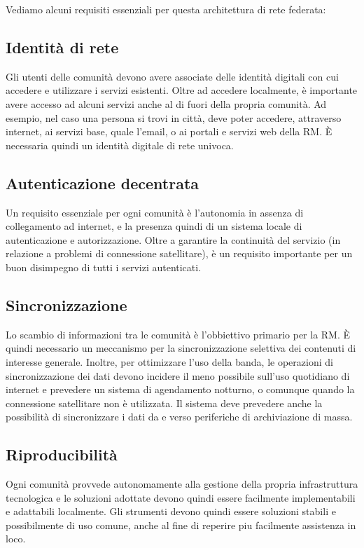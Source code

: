 Vediamo alcuni requisiti essenziali per questa architettura di rete
federata:

\subsection{Identità di rete}
Gli utenti delle comunità devono avere associate delle identità
digitali con cui accedere e utilizzare i servizi esistenti. Oltre ad
accedere localmente, è importante avere accesso ad alcuni servizi
anche al di fuori della propria comunità. Ad esempio, nel caso una
persona si trovi in città, deve poter accedere, attraverso internet,
ai servizi base, quale l'email, o ai portali e servizi web della
RM. È necessaria quindi un identità digitale di rete univoca.

\subsection{Autenticazione decentrata}
\label{sec:AutDec}
Un requisito essenziale per ogni comunità è l'autonomia in assenza di
collegamento ad internet, e la presenza quindi di un sistema locale di
autenticazione e autorizzazione. Oltre a garantire la continuità del
servizio (in relazione a problemi di connessione satellitare), è un
requisito importante per un buon disimpegno di tutti i servizi
autenticati.

\subsection{Sincronizzazione}
Lo scambio di informazioni tra le comunità è l'obbiettivo primario per
la RM. È quindi necessario un meccanismo per la sincronizzazione
selettiva dei contenuti di interesse generale. Inoltre, per
ottimizzare l'uso della banda, le operazioni di sincronizzazione dei
dati devono incidere il meno possibile sull'uso quotidiano di internet
e prevedere un sistema di agendamento notturno, o comunque quando la
connessione satellitare non è utilizzata. Il sistema deve prevedere
anche la possibilità di sincronizzare i dati da e verso periferiche di
archiviazione di massa.

\subsection{Riproducibilità}
Ogni comunità provvede autonomamente alla gestione della propria infrastruttura
tecnologica e le soluzioni adottate devono quindi essere facilmente
implementabili e adattabili localmente. Gli strumenti devono quindi essere
soluzioni stabili e possibilmente di uso comune, anche al fine di
reperire piu facilmente assistenza in loco. 


